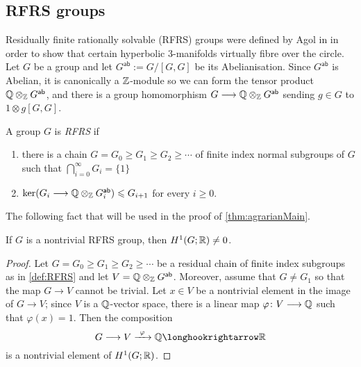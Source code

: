 \documentclass[11pt, letterpaper]{amsart}
\begin{document}

\subsection{RFRS groups}

Residually finite rationally solvable (RFRS) groups were defined by Agol in \cite{AgolCritVirtFib} in order to show that certain hyperbolic $3$-manifolds virtually fibre over the circle. Let $G$ be a group and let $G^\mathsf{ab} := G/[G,G]$ be its Abelianisation. Since $G^\mathsf{ab}$ is Abelian, it is canonically a $\mathbb{Z}$-module so we can form the tensor product $\mathbb{Q} \otimes_{\mathbb{Z}} G^\mathsf{ab}$, and there is a group homomorphism $G \longrightarrow \mathbb{Q} \otimes_{\mathbb{Z}} G^{\mathsf{ab}}$ sending $g \in G$ to $1 \otimes g[G,G]$.
\begin{defn} \label{def:RFRS}
A group $G$ is \textit{RFRS} if 
\begin{enumerate}[label = (\arabic*)]
    \item there is a chain $G = G_0 \geqslant G_1 \geqslant G_2 \geqslant \cdots$ of finite index normal subgroups of $G$ such that $\bigcap_{i=0}^\infty G_i = \{1\}$
    \item $\ker(G_i \longrightarrow \mathbb{Q} \otimes_{\mathbb{Z}} G_i^{\mathsf{ab}}) \leqslant G_{i+1}$ for every $i \geqslant 0$.
\end{enumerate}
\end{defn}

The following fact that will be used in the proof of \cref{thm:agrarianMain}.

\begin{prop}\label{prop:RFRStoQ}
If $G$ is a nontrivial RFRS group, then $H^1(G;\mathbb{R}) \neq 0$.
\end{prop}
\begin{proof}
Let $G = G_0 \geqslant G_1 \geqslant G_2 \geqslant \cdots$ be a residual chain of finite index subgroups as in \cref{def:RFRS} and let $V = \mathbb{Q} \otimes_{\mathbb{Z}} G^\mathsf{ab}$. Moreover, assume that $G \neq G_1$ so that the map $G \longrightarrow V$ cannot be trivial. Let $x \in V$ be a nontrivial element in the image of $G \longrightarrow V$; since $V$ is a $\mathbb{Q}$-vector space, there is a linear map $\varphi \colon V \longrightarrow \mathbb{Q}$ such that $\varphi(x) = 1$. Then the composition 
\[
    G \longrightarrow V \xrightarrow{\ \varphi \ } \Q \longhookrightarrow \R
\]
is a nontrivial element of $H^1(G;\mathbb{R})$.
\end{proof}



\end{document}
